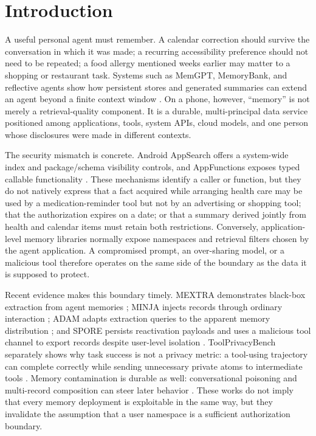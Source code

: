 \section{Introduction}
\label{sec:introduction}

A useful personal agent must remember. A calendar correction should survive the conversation in which it was made; a recurring accessibility preference should not need to be repeated; a food allergy mentioned weeks earlier may matter to a shopping or restaurant task. Systems such as MemGPT, MemoryBank, and reflective agents show how persistent stores and generated summaries can extend an agent beyond a finite context window \citep{packer2023memgpt,zhong2024memorybank,shinn2023reflexion}. On a phone, however, ``memory'' is not merely a retrieval-quality component. It is a durable, multi-principal data service positioned among applications, tools, system APIs, cloud models, and one person whose disclosures were made in different contexts.

The security mismatch is concrete. Android AppSearch offers a system-wide index and package/schema visibility controls, and AppFunctions exposes typed callable functionality \citep{android2026appsearch,android2026visibility,android2026appfunctions}. These mechanisms identify a caller or function, but they do not natively express that a fact acquired while arranging health care may be used by a medication-reminder tool but not by an advertising or shopping tool; that the authorization expires on a date; or that a summary derived jointly from health and calendar items must retain both restrictions. Conversely, application-level memory libraries normally expose namespaces and retrieval filters chosen by the agent application. A compromised prompt, an over-sharing model, or a malicious tool therefore operates on the same side of the boundary as the data it is supposed to protect.

Recent evidence makes this boundary timely. MEXTRA demonstrates black-box extraction from agent memories \citep{wang2025mextra}; MINJA injects records through ordinary interaction \citep{dong2025minja}; ADAM adapts extraction queries to the apparent memory distribution \citep{lyu2026adam}; and SPORE persists reactivation payloads and uses a malicious tool channel to export records despite user-level isolation \citep{gao2026spore}. ToolPrivacyBench separately shows why task success is not a privacy metric: a tool-using trajectory can complete correctly while sending unnecessary private atoms to intermediate tools \citep{hu2026toolprivacy}. Memory contamination is durable as well: conversational poisoning and multi-record composition can steer later behavior \citep{wang2026hijacking,gao2026mempoison,xie2026memevobench}. These works do not imply that every memory deployment is exploitable in the same way, but they invalidate the assumption that a user namespace is a sufficient authorization boundary.

